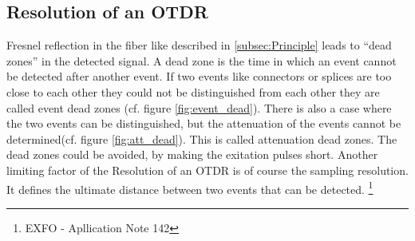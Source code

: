 \subsection{Resolution of an OTDR}
\begin{figure}[h]%
\centering
	\qquad
\caption{}%
\label{fig:dead}
\end{figure}



Fresnel reflection in the fiber like described in \ref{subsec:Principle} leads to ``dead zones'' in the detected signal. A dead zone is the time in which an event cannot be detected after another event. If two events like connectors or splices are too close to each other they could not be distinguished from each other they are called event dead zones (cf. figure \ref{fig:event_dead}). There is also a case where the two events can be distinguished, but the attenuation of the events cannot be determined(cf. figure \ref{fig:att_dead}). This is called attenuation dead zones. The dead zones could be avoided, by making the exitation pulses short. Another limiting factor of the Resolution of an OTDR is of course the sampling resolution. It defines the ultimate distance between two events that can be detected. \footnote[3]{EXFO - Apllication Note 142}






